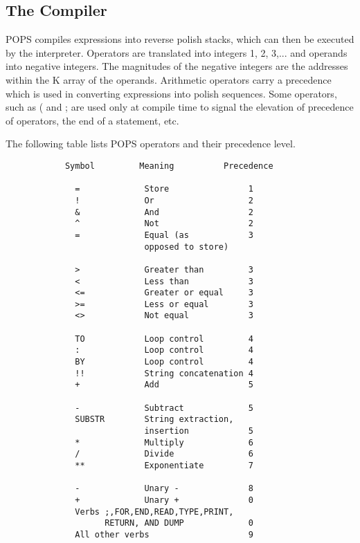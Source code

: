 \subsection{The Compiler}
POPS compiles expressions into reverse polish stacks, which can then
be executed by the interpreter.  Operators are translated into
integers 1, 2, 3,... and operands into negative integers.  The
magnitudes of the negative integers are the addresses within the K
array of the operands.  Arithmetic operators carry a precedence which
is used in converting expressions into polish sequences.  Some
operators, such as ( and ; are used only at compile time to signal the
elevation of precedence of operators, the end of a statement, etc.

The following table lists POPS operators and their precedence level.
\pagebreak
\begin{verbatim}
            Symbol         Meaning          Precedence

              =             Store                1
              !             Or                   2
              &             And                  2
              ^             Not                  2
              =             Equal (as            3
                            opposed to store)

              >             Greater than         3
              <             Less than            3
              <=            Greater or equal     3
              >=            Less or equal        3
              <>            Not equal            3

              TO            Loop control         4
              :             Loop control         4
              BY            Loop control         4
              !!            String concatenation 4
              +             Add                  5

              -             Subtract             5
              SUBSTR        String extraction,
                            insertion            5
              *             Multiply             6
              /             Divide               6
              **            Exponentiate         7

              -             Unary -              8
              +             Unary +              0
              Verbs ;,FOR,END,READ,TYPE,PRINT,
                    RETURN, AND DUMP             0
              All other verbs                    9


\end{verbatim}
